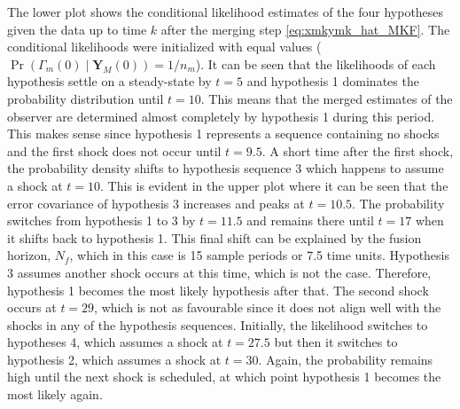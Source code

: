 The lower plot shows the conditional likelihood estimates of the four hypotheses given the data up to time $k$ after the merging step \eqref{eq:xmkymk_hat_MKF}. The conditional likelihoods were initialized with equal values ($\operatorname{Pr}\left(\Gamma_m(0) \mid \mathbf{Y}_M(0)\right)=1/n_m$). It can be seen that the likelihoods of each hypothesis settle on a steady-state by $t=5$ and hypothesis 1 dominates the probability distribution until $t=10$. This means that the merged estimates of the observer are determined almost completely by hypothesis 1 during this period. This makes sense since hypothesis 1 represents a sequence containing no shocks and the first shock does not occur until $t=9.5$. A short time after the first shock, the probability density shifts to hypothesis sequence 3 which happens to assume a shock at $t=10$. This is evident in the upper plot where it can be seen that the error covariance of hypothesis 3 increases and peaks at $t=10.5$. The probability switches from hypothesis 1 to 3 by $t=11.5$ and remains there until $t=17$ when it shifts back to hypothesis 1. This final shift can be explained by the fusion horizon, $N_f$, which in this case is 15 sample periods or 7.5 time units. Hypothesis 3 assumes another shock occurs at this time, which is not the case. Therefore, hypothesis 1 becomes the most likely hypothesis after that. The second shock occurs at $t=29$, which is not as favourable since it does not align well with the shocks in any of the hypothesis sequences. Initially, the likelihood switches to hypotheses 4, which assumes a shock at $t=27.5$ but then it switches to hypothesis 2, which assumes a shock at $t=30$. Again, the probability remains high until the next shock is scheduled, at which point hypothesis 1 becomes the most likely again.


